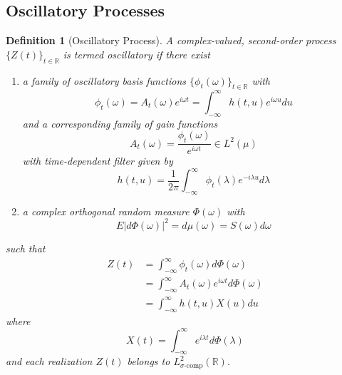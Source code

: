 \documentclass{article}
\newcommand{\tmem}[1]{{\em #1\/}}
\newtheorem{definition}{Definition}
\begin{document}
\subsection{Oscillatory Processes}

\begin{definition}
  [Oscillatory Process]\label{def:oscillatory} A complex-valued, second-order
  process $\{Z (t)\}_{t \in \mathbb{R}}$ is termed {\tmem{oscillatory}} if
  there exist
  \begin{enumerate}
    \item a family of oscillatory basis functions $\{\phi_t (\omega)\}_{t \in
    \mathbb{R}}$ with
    \begin{equation}
      \phi_t (\omega) = A_t (\omega) e^{i \omega t} = \int_{- \infty}^{\infty}
      h (t, u) e^{i \omega u} du
    \end{equation}
    and a corresponding family of gain functions
    \begin{equation}
      A_t (\omega) = \frac{\phi_t (\omega)}{e^{i \omega t}} \in L^2 (\mu)
      \label{envelope}
    \end{equation}
    with time-dependent filter given by
    \begin{equation}
      h (t, u) = \frac{1}{2 \pi}  \int_{- \infty}^{\infty} \phi_t (\lambda)
      e^{- i \lambda u} d \lambda
    \end{equation}
    \item a complex orthogonal random measure $\Phi (\omega)$ with
    \begin{equation}
      E |d \Phi (\omega) |^2 = d \mu (\omega) = S (\omega) d \omega
    \end{equation}
  \end{enumerate}
  such that
  \begin{equation}
    \label{eq:oscillatory_rep}
    
    \begin{aligned}
      Z (t) & = \int_{- \infty}^{\infty} \phi_t (\omega) d \Phi (\omega)\\
      & = \int_{- \infty}^{\infty} A_t (\omega) e^{i \omega t} d \Phi
      (\omega)\\
      & = \int_{- \infty}^{\infty} h (t, u) X (u) du
    \end{aligned}
  \end{equation}
  where
  \begin{equation}
    X (t) = \int_{- \infty}^{\infty} e^{i \lambda t} d \Phi (\lambda)
  \end{equation}
  and each realization $Z (t)$ belongs to $L^2_{\sigma \text{-comp}}
  (\mathbb{R})$.
\end{definition}
\end{document}
